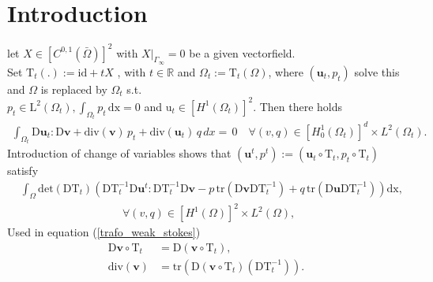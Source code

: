 \section{Introduction}

\begin{proof*}
    let $X \in [C^{0,1}(\bar{\Omega})]^2$ with $X \rvert_{\Gamma_{\infty}} = 0$ be a given vectorfield. \\
    Set $\mathrm{T}_t(.) := \mathrm{id} + tX $ , with $t \in \mathbb{R}$ and $\Omega_t := \mathrm{T}_t(\Omega)$, where 
    $(\mathbf{u}_t, p_t)$ solve this and $\Omega$ is replaced by $\Omega_t$ s.t. \\
    $p_t \in \mathrm{L}^2(\Omega_t), \int_{\Omega_t} p_t \, \mathrm{dx} = 0 $ and $\mathrm{u}_t \in [H^1(\Omega_t)]^2$. Then there holds 
    \begin{align}
        \int_{\Omega_t} \mathrm{D} \mathbf{u}_t : \mathrm{D} \mathbf{\mathbf{v}} + \mathrm{div}(\mathbf{v}) \, p_t + \mathrm{div}(\mathbf{u}_t) \, q \, dx = \, 0 \quad \forall (v,q)
        \in  [H^1_0(\Omega_t)]^d \times L^2(\Omega_t).
    \end{align}
    Introduction of change of variables shows that $(\mathbf{u}^t, p^t) := (\mathbf{u}_t \circ \mathrm{T}_t, p_t \circ \mathrm{T}_t)$ satisfy
    \begin{equation}
    \begin{aligned}\label{trafo_weak_stokes}
        &\int_\Omega \mathrm{det}(\mathrm{DT}_t)
        \left( \mathrm{DT}_t^{-1} \mathrm{D}\mathbf{u}^t:\mathrm{DT}_t^{-1} \mathrm{D}\mathbf{v} -p\, \mathrm{tr}(\mathrm{D}\mathbf{v}\mathrm{DT}_t^{-1})  +
        q \, \mathrm{tr}(\mathrm{D}\mathbf{u}\mathrm{DT}_t^{-1}) \right) \mathrm{dx}, \\
        & \quad \quad \quad \quad \quad \quad \quad \quad \quad \ \forall (v,q) \in [H^1(\Omega)]^2 \times L^2(\Omega),
    \end{aligned}
    \end{equation}
    Used in equation (\ref{trafo_weak_stokes})
    \begin{align*}
        \mathrm{D}\mathbf{v}\circ\mathrm{T}_t &= \mathrm{D}(\mathbf{v}\circ\mathrm{T}_t), \\
        \mathrm{div}(\mathbf{v}) &= \mathrm{tr} \left( \mathrm{D}(\mathbf{v} \circ \mathrm{T}_t)(\mathrm{DT}_t^{-1}) \right).
    \end{align*}
      

\end{proof*}
